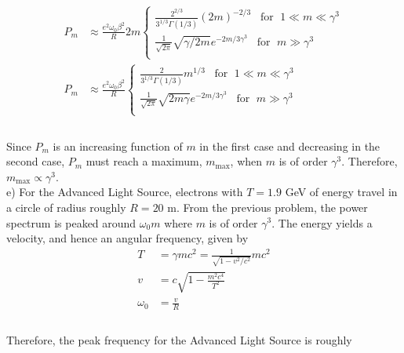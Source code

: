 \documentclass[]{article}
\begin{document}
\begin{equation}
\begin{aligned}
P_m & \approx \frac{ e^2 \omega_0 \beta^2   }{ R}  2 m   
\begin{cases}
\frac{ 2^{2/3} }{ 3^{1/3} \Gamma(1/3) } (2m)^{-2/3} \; \; \; \text{for } \; 1 \ll m \ll \gamma^3 \\
\frac{ 1}{ \sqrt{ 2\pi }} \sqrt{ \gamma / 2m} e^{ - 2m / 3\gamma^3 } \; \; \; \text{for } \;  m \gg \gamma^3 \\
\end{cases}   \\
%
P_m & \approx \frac{ e^2 \omega_0 \beta^2   }{ R}   
\begin{cases}
\frac{ 2 }{ 3^{1/3} \Gamma(1/3) } m^{1/3} \; \; \; \text{for } \; 1 \ll m \ll \gamma^3 \\
\frac{ 1}{ \sqrt{ 2\pi }} \sqrt{ 2m \gamma } e^{ - 2m / 3\gamma^3 } \; \; \; \text{for } \;  m \gg \gamma^3 \\
\end{cases}   \\
%
\end{aligned} 
\end{equation} \\

Since $P_m$ is an increasing function of $m$ in the first case and decreasing in the second case, $P_m$ must reach a maximum, $m_\text{max}$, when $m$ is of order $\gamma^3$. Therefore, $m_\text{max} \propto \gamma^3$.  \\

e) For the Advanced Light Source, electrons with $T = 1.9$ GeV of energy travel in a circle of radius roughly $R = 20$ m. From the previous problem, the power spectrum is peaked around $\omega_0 m$ where $m$ is of order $\gamma^3$. The energy yields a velocity, and hence an angular frequency, given by \\


\begin{equation}
\begin{aligned}
T & = \gamma m c^2  = \frac{ 1 }{ \sqrt{1 - v^2/c^2} } mc^2\\
v &= c \sqrt{ 1 - \frac{ m^2 c^4 }{ T^2 }} \\  
\omega_0 & = \frac{ v }{ R} \\
\end{aligned} 
\end{equation} \\

Therefore, the peak frequency for the Advanced Light Source is roughly \\
\end{document}
